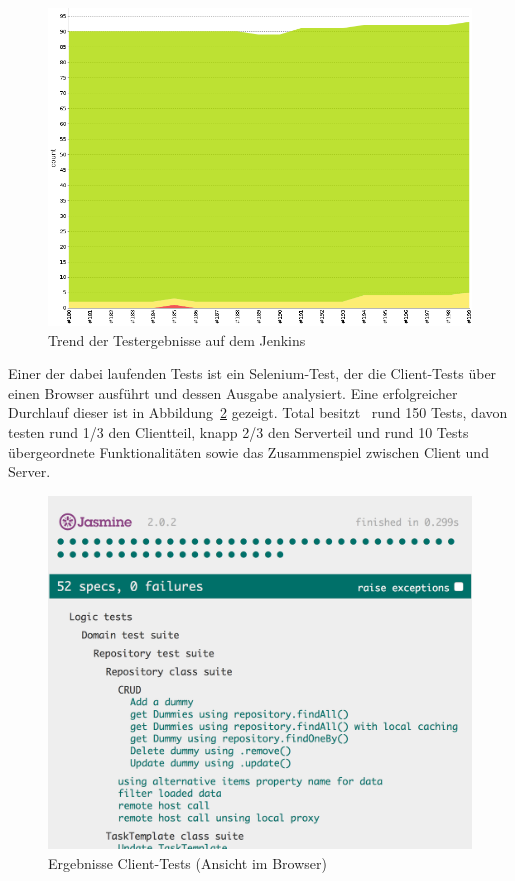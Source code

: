 			\begin{figure}[H]
				\includegraphics[width=\linewidth]{projectPlan/media/img/jenkinsTrend.png}
				\centering
				\caption{Trend der Testergebnisse auf dem Jenkins}
				\label{fig:jenkinsTrend}
			\end{figure}
			
			Einer der dabei laufenden Tests ist ein Selenium-Test, der die Client-Tests über einen Browser ausführt und dessen Ausgabe analysiert.
			Eine erfolgreicher Durchlauf dieser ist in Abbildung~\ref{fig:clientTestResult} gezeigt.
			Total besitzt \eeppi\ rund 150 Tests, davon testen rund 1/3 den Clientteil, knapp 2/3 den Serverteil
			und rund 10 Tests übergeordnete Funktionalitäten sowie das Zusammenspiel zwischen Client und Server.
			
			\begin{figure}[H]
				\includegraphics[width=0.8\linewidth]{projectPlan/media/img/clientTestResult.png}
				\centering
				\caption{Ergebnisse Client-Tests (Ansicht im Browser)}
				\label{fig:clientTestResult}
			\end{figure}
